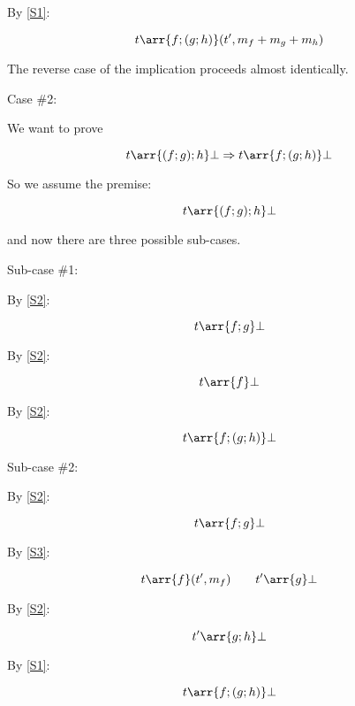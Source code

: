 By \eqref{S1}:

\begin{equation}
t \arr{f;(g;h)} (t',m_f+m_g+m_h)
\end{equation}

The reverse case of the implication proceeds almost identically.

Case \#2:

We want to prove

\begin{equation}
t \arr{(f;g);h} \bot \Rightarrow t \arr{f;(g;h)} \bot
\end{equation}

So we assume the premise:

\begin{equation}
t \arr{(f;g);h} \bot
\end{equation}

and now there are three possible sub-cases.

Sub-case \#1:

By \eqref{S2}:

\begin{equation}
t \arr{f;g} \bot
\end{equation}

By \eqref{S2}:

\begin{equation}
t \arr{f} \bot
\end{equation}

By \eqref{S2}:

\begin{equation}
t \arr{f;(g;h)} \bot
\end{equation}

Sub-case \#2:

By \eqref{S2}:

\begin{equation}
t \arr{f;g} \bot
\end{equation}

By \eqref{S3}:

\begin{equation}
t \arr{f} (t',m_f) \qquad t' \arr{g} \bot
\end{equation}

By \eqref{S2}:

\begin{equation}
t' \arr{g;h} \bot
\end{equation}

By \eqref{S1}:

\begin{equation}
t \arr{f;(g;h)} \bot
\end{equation}

